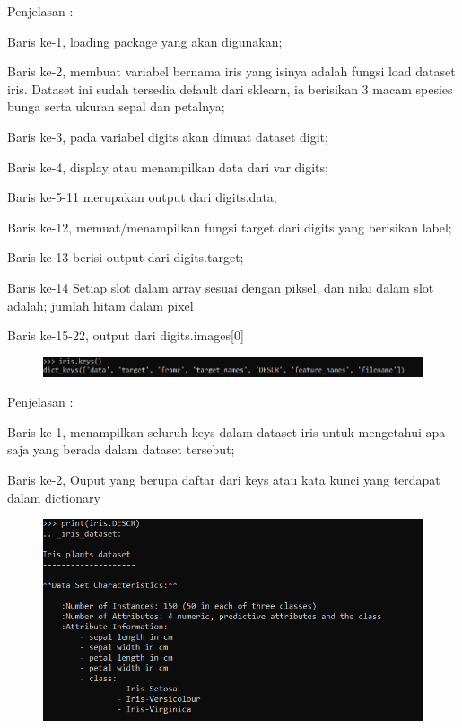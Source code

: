 \begin{enumerate}
\begin{figure}[!htbp]
    \label{Figure}
    \end{figure}
    \par
    Penjelasan : 
    \par
    Baris ke-1, loading package yang akan digunakan;
    \par
    Baris ke-2, membuat variabel bernama iris yang isinya adalah fungsi load dataset iris. Dataset ini sudah tersedia default dari sklearn, ia berisikan 3 macam spesies bunga serta ukuran sepal dan petalnya;
    \par
    Baris ke-3, pada variabel digits akan dimuat dataset digit;
    \par
    Baris ke-4, display atau menampilkan data dari var digits;
    \par
    Baris ke-5-11 merupakan output dari digits.data;
    \par
    Baris ke-12, memuat/menampilkan fungsi target dari digits yang berisikan label;
    \par
    Baris ke-13 berisi output dari digits.target;
    \par
    Baris ke-14 Setiap slot dalam array sesuai dengan piksel, dan nilai dalam slot adalah; jumlah hitam dalam pixel
    \par
    Baris ke-15-22, output dari digits.images[0]
    \newpage
    \begin{figure}[!htbp]
    \centering
    \includegraphics[scale=0.8]{figures/Loadingdatasets/5.PNG}
    \label{Figure}
    \end{figure}
    \par
    Penjelasan :
    \par
    Baris ke-1, menampilkan seluruh keys dalam dataset iris untuk mengetahui apa saja yang berada dalam dataset tersebut; 
    \par
    Baris ke-2, Ouput yang berupa daftar dari keys atau kata kunci yang terdapat dalam dictionary
    \begin{figure}[!htbp]
    \centering
    \includegraphics[scale=0.9]{figures/Loadingdatasets/6.PNG}

\end{figure}
\end{enumerate}
